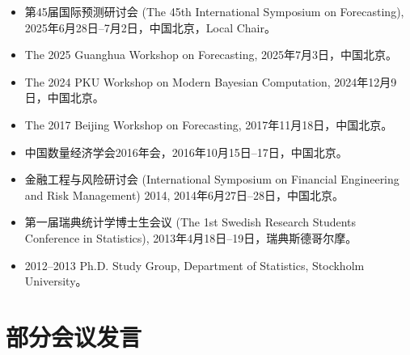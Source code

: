 \documentclass[twoside,a4paper,11pt]{article}
\begin{document}
\begin{itemize}

\item 第45届国际预测研讨会 (The 45th International Symposium on Forecasting), 2025年6月28日--7月2日，中国北京，Local Chair。
\item The 2025 Guanghua Workshop on Forecasting, 2025年7月3日，中国北京。
\item The 2024 PKU Workshop on Modern Bayesian Computation, 2024年12月9日，中国北京。
\item The 2017 Beijing Workshop on Forecasting, 2017年11月18日，中国北京。
\item 中国数量经济学会2016年会，2016年10月15日--17日，中国北京。

\item 金融工程与风险研讨会 (International Symposium on Financial Engineering and Risk Management) 2014,
  2014年6月27日--28日，中国北京。

\item 第一届瑞典统计学博士生会议 (The 1st Swedish Research Students Conference in Statistics), 2013年4月18日--19日，瑞典斯德哥尔摩。
\item 2012--2013 Ph.D. Study Group, Department of Statistics, Stockholm University。
\end{itemize}

\section{部分会议发言}
\end{document}
